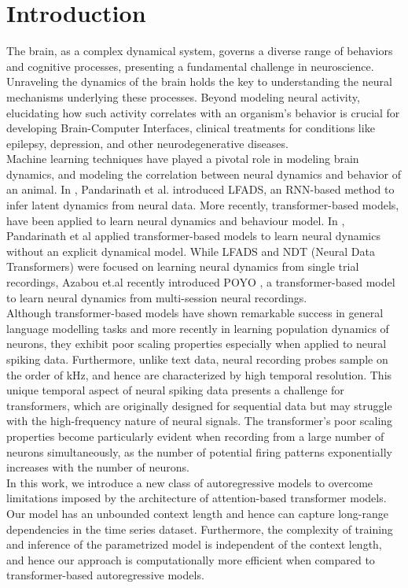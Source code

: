 \chapter{Introduction}
The brain, as a complex dynamical system, governs a diverse range of behaviors and cognitive processes, presenting a fundamental challenge in neuroscience. Unraveling the dynamics of the brain holds the key to understanding the neural mechanisms underlying these processes. Beyond modeling neural activity, elucidating how such activity correlates with an organism's behavior is crucial for developing Brain-Computer Interfaces, clinical treatments for conditions like epilepsy, depression, and other neurodegenerative diseases. \\


Machine learning techniques have played a pivotal role in modeling brain dynamics, and modeling the correlation between neural dynamics and behavior of an animal. In \cite{pandarinath2018inferring}, Pandarinath et al. introduced LFADS, an RNN-based method to infer latent dynamics from neural data.  More recently, transformer-based models\cite{vaswani2017attention, geneva2022transformers}, have been applied to learn neural dynamics and behaviour model. In \cite{ye2021representation}, Pandarinath et al applied transformer-based models to learn neural dynamics without an explicit dynamical model. While LFADS and NDT (Neural Data Transformers) were focused on learning neural dynamics from single trial recordings, Azabou et.al recently introduced POYO \cite{azabou2023unified}, a transformer-based model to learn neural dynamics from multi-session neural recordings.
\\

Although transformer-based models have shown remarkable success in general language modelling tasks and more recently in learning population dynamics of neurons, they exhibit poor scaling properties especially when applied to neural spiking data. Furthermore, unlike text data, neural recording probes sample on the order of kHz, and hence are characterized by high temporal resolution. This unique temporal aspect of neural spiking data presents a challenge for transformers, which are originally designed for sequential data but may struggle with the high-frequency nature of neural signals. The transformer's poor scaling properties become particularly evident when recording from a large number of neurons simultaneously, as the number of potential firing patterns exponentially increases with the number of neurons.
\\

In this work, we introduce a new class of autoregressive models to overcome limitations imposed by the architecture of attention-based transformer models. Our model has an unbounded context length and hence can capture long-range dependencies in the time series dataset. Furthermore, the complexity of training and inference of the parametrized model is independent of the context length, and hence our approach is computationally more efficient when compared to transformer-based autoregressive models.
